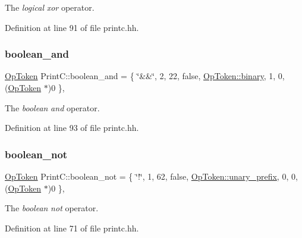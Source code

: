 The {\itshape logical} {\itshape xor} operator. 



Definition at line 91 of file printc.\+hh.

\mbox{\label{class_print_c_a1d27aadfb5e25d1f65cc9af856dd0566}} 
\subsubsection{\texorpdfstring{boolean\_and}{boolean\_and}}
{\footnotesize\ttfamily \mbox{\hyperlink{class_op_token}{Op\+Token}} Print\+C\+::boolean\+\_\+and = \{ \char`\"{}\&\&\char`\"{}, 2, 22, false, \mbox{\hyperlink{class_op_token_af41c7f108d5662ede7765c5a6c44eaffa3a2ec63522a9329a71ddbe8adc3e752d}{Op\+Token\+::binary}}, 1, 0, (\mbox{\hyperlink{class_op_token}{Op\+Token}} $\ast$)0 \}\hspace{0.3cm}{\ttfamily [static]}, {\ttfamily [protected]}}



The {\itshape boolean} {\itshape and} operator. 



Definition at line 93 of file printc.\+hh.

\mbox{\label{class_print_c_a643d3b211527b727681fab774516d19c}} 
\subsubsection{\texorpdfstring{boolean\_not}{boolean\_not}}
{\footnotesize\ttfamily \mbox{\hyperlink{class_op_token}{Op\+Token}} Print\+C\+::boolean\+\_\+not = \{ \char`\"{}!\char`\"{}, 1, 62, false, \mbox{\hyperlink{class_op_token_af41c7f108d5662ede7765c5a6c44eaffa0d809c13f66611247b81856fc9e68289}{Op\+Token\+::unary\+\_\+prefix}}, 0, 0, (\mbox{\hyperlink{class_op_token}{Op\+Token}} $\ast$)0 \}\hspace{0.3cm}{\ttfamily [static]}, {\ttfamily [protected]}}



The {\itshape boolean} {\itshape not} operator. 



Definition at line 71 of file printc.\+hh.

\mbox{\label{class_print_c_ae664fd2b1cbfba34687c8b51a984ffec}} 
